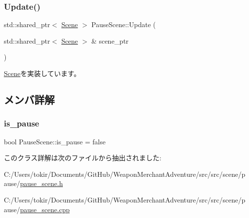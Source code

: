 \mbox{\label{class_pause_scene_a6adfe0685eb6bc64e658f6364c9f704d}} 
\subsubsection{\texorpdfstring{Update()}{Update()}}
{\footnotesize\ttfamily std\+::shared\+\_\+ptr$<$ \mbox{\hyperlink{class_scene}{Scene}} $>$ Pause\+Scene\+::\+Update (\begin{DoxyParamCaption}\item[{std\+::shared\+\_\+ptr$<$ \mbox{\hyperlink{class_scene}{Scene}} $>$ \&}]{scene\+\_\+ptr }\end{DoxyParamCaption})\hspace{0.3cm}{\ttfamily [virtual]}}



\mbox{\hyperlink{class_scene_ab71ee5f19764b90c87b4574aa1cb1d25}{Scene}}を実装しています。



\subsection{メンバ詳解}
\mbox{\label{class_pause_scene_ae6b7dfe712032062c6406a05cd258756}} 
\subsubsection{\texorpdfstring{is\+\_\+pause}{is\_pause}}
{\footnotesize\ttfamily bool Pause\+Scene\+::is\+\_\+pause = false}



このクラス詳解は次のファイルから抽出されました\+:\begin{DoxyCompactItemize}
\item 
C\+:/\+Users/tokir/\+Documents/\+Git\+Hub/\+Weapon\+Merchant\+Adventure/src/src/scene/pause/\mbox{\hyperlink{pause__scene_8h}{pause\+\_\+scene.\+h}}\item 
C\+:/\+Users/tokir/\+Documents/\+Git\+Hub/\+Weapon\+Merchant\+Adventure/src/src/scene/pause/\mbox{\hyperlink{pause__scene_8cpp}{pause\+\_\+scene.\+cpp}}\end{DoxyCompactItemize}
